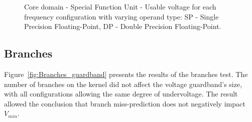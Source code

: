 \begin{figure}[!htb]
    \centering
    \begin{subfigmatrix}{2}
      \label{fig:SFU_guardband}
    \end{subfigmatrix}
    \caption{Core domain - Special Function Unit - Usable voltage for each frequency configuration with varying operand type: SP - Single Precision Floating-Point, DP - Double Precision Floating-Point.}
\end{figure}

\subsection{Branches}

Figure~\ref{fig:Branches_guardband} presents the results of the branches test. The number of branches on the kernel did not affect the voltage guardband's size, with all configurations allowing the same degree of undervoltage.
The result allowed the conclusion that branch miss-prediction does not negatively impact $V_{min}$.


